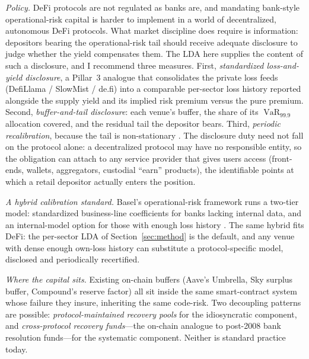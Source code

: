 \documentclass[runningheads]{llncs}
\newcommand{\VaR}{\operatorname{VaR}}
\begin{document}
\emph{Policy.}\label{sec:policy} DeFi protocols are not regulated as
banks are, and mandating bank-style operational-risk capital is harder
to implement in a world of decentralized, autonomous DeFi protocols.
What market discipline does require is information: depositors bearing
the operational-risk tail should receive adequate disclosure to judge
whether the yield compensates them. The LDA here supplies the content
of such a disclosure, and I recommend three measures. First,
\emph{standardized loss-and-yield disclosure}, a Pillar~3 analogue that
consolidates the private loss feeds (DefiLlama / SlowMist / de.fi) into
a comparable per-sector loss history reported alongside the supply
yield and its implied risk premium versus the pure premium. Second,
\emph{buffer-and-tail disclosure}: each venue's buffer, the share of
its $\VaR_{99.9}$ allocation covered, and the residual tail the
depositor bears. Third, \emph{periodic recalibration}, because the tail
is non-stationary
\citep{BCBS2017,Flannery1998,Egan2017,Wheatley2016}. The disclosure
duty need not fall on the protocol alone: a decentralized protocol may
have no responsible entity, so the obligation can attach to any service
provider that gives users access (front-ends, wallets, aggregators,
custodial ``earn'' products), the identifiable points at which a retail
depositor actually enters the position.

\emph{A hybrid calibration standard.} Basel's operational-risk framework
runs a two-tier model: standardized business-line coefficients for banks
lacking internal data, and an internal-model option for those with
enough loss history \citep{BCBS2017}. The same hybrid fits DeFi: the
per-sector LDA of Section~\ref{sec:method} is the default, and any
venue with dense enough own-loss history can
substitute a protocol-specific model, disclosed and periodically
recertified.

\emph{Where the capital sits.} Existing on-chain buffers (Aave's
Umbrella, Sky surplus buffer, Compound's reserve factor) all sit inside
the same smart-contract system whose failure they insure, inheriting
the same code-risk. Two decoupling patterns are possible:
\emph{protocol-maintained recovery pools} for the idiosyncratic
component, and \emph{cross-protocol recovery funds}---the on-chain
analogue to post-2008 bank resolution funds---for the systematic
component. Neither is standard practice today.
\end{document}
